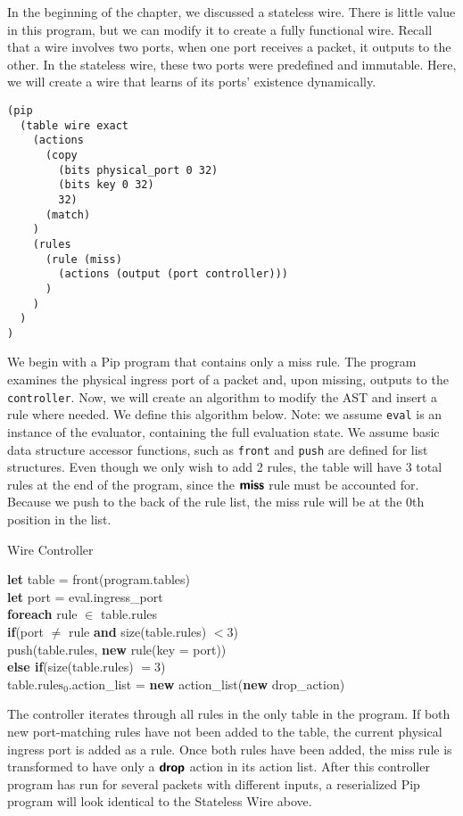 In the beginning of the chapter, we discussed a stateless wire. There is little value in this program, but we can modify it to create a fully functional wire. Recall that a wire involves two ports, when one port receives a packet, it outputs to the other. In the stateless wire, these two ports were predefined and immutable. Here, we will create a wire that learns of its ports' existence dynamically.

\begin{lstlisting}
(pip
  (table wire exact
    (actions
      (copy
        (bits physical_port 0 32)
        (bits key 0 32)
        32)
      (match)
    )
    (rules
      (rule (miss)
        (actions (output (port controller)))
      )
    )
  )
)
\end{lstlisting}
We begin with a Pip program that contains only a miss rule. The program examines the physical ingress port of a packet and, upon missing, outputs to the \texttt{controller}. Now, we will create an algorithm to modify the AST and insert a rule where needed. We define this algorithm below. Note: we assume \texttt{eval} is an instance of the evaluator, containing the full evaluation state. We assume basic data structure accessor functions, such as \texttt{front} and \texttt{push} are defined for list structures. Even though we only wish to add 2 rules, the table will have 3 total rules at the end of the program, since the $\bm{\mathsf{{miss}}}$ rule must be accounted for. Because we push to the back of the rule list, the miss rule will be at the 0th position in the list.
\begin{algorithm}
\caption{Wire Controller}
\textbf{let} table = front(program.tables)\\
\textbf{let} port = eval.ingress\_port\\
\textbf{foreach} rule $\in$ table.rules\\
\tab\textbf{if}(port $\neq$ rule \textbf{and} size(table.rules) $< 3$)\\
\tab\tab push(table.rules, \textbf{new} rule(key = port))\\
\tab\textbf{else if}(size(table.rules) $= 3$)\\
\tab\tab table.$\textrm{rules}_0$.action\_list = \textbf{new} action\_list(\textbf{new} drop\_action)
\end{algorithm}
The controller iterates through all rules in the only table in the program. If both new port-matching rules have not been added to the table, the current physical ingress port is added as a rule. Once both rules have been added, the miss rule is transformed to have only a $\bm{\mathsf{{drop}}}$ action in its action list. After this controller program has run for several packets with different inputs, a reserialized Pip program will look identical to the Stateless Wire above.
